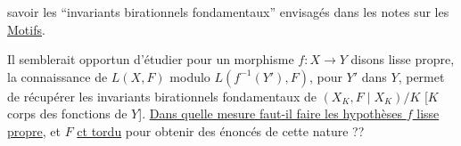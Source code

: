 savoir les ``invariants birationnels fondamentaux''   envisagés dans les notes sur les \uline{Motifs}.

\noindent\makebox[0pt][r]{\rule[-3\baselineskip]{.35pt}{3.9\baselineskip}\hspace{2pt}\rule[-3\baselineskip]{.35pt}{3.9\baselineskip}\hspace{.55em}}Il semblerait opportun d'étudier   pour un morphisme $f:X\longrightarrow Y$ disons lisse propre,  la connaissance de  $L(X,F)$ modulo $L(f^{-1}(Y'),F)$, pour $Y'$  dans $Y$, permet de récupérer les invariants birationnels fondamentaux de $(X_K,F\mid X_K)/K$ [$K$ corps des fonctions de $Y$]. \uline{Dans quelle mesure faut-il faire les hypothèses $f$ lisse propre}, et $F$ \uline{ct tordu} pour obtenir des énoncés de cette nature ??
